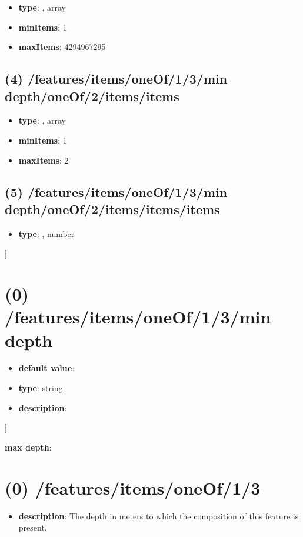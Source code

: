 \begin{itemize}[leftmargin=3em]\item {\bf type}: , array\item {\bf minItems}: 1
\item {\bf maxItems}: 4294967295
\end{itemize}\subsection{(4) /features/items/oneOf/1/3/min depth/oneOf/2/items/items}
\begin{itemize}[leftmargin=4em]\item {\bf type}: , array\item {\bf minItems}: 1
\item {\bf maxItems}: 2
\end{itemize}\subsection{(5) /features/items/oneOf/1/3/min depth/oneOf/2/items/items/items}
\begin{itemize}[leftmargin=5em]\item {\bf type}: , number\end{itemize}]\section{(0) /features/items/oneOf/1/3/min depth}
\begin{itemize}[leftmargin=0em]\item {\bf default value}: 
\item {\bf type}: string
\item {\bf description}: 
\end{itemize}]\item {\bf max depth}: \section{(0) /features/items/oneOf/1/3}
\begin{itemize}[leftmargin=0em]\item {\bf description}: The depth in meters to which the composition of this feature is present.
\end{itemize}
